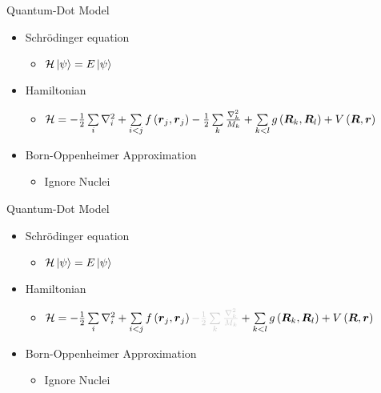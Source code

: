 \documentclass[10pt, t, xcolor=dvipsnames]{beamer}
\begin{document}
\begin{frame}[fragile]{Quantum-Dot Model}
    \begin{itemize}
        \item Schrödinger equation 
            \begin{itemize}
                \item $\mathcal{H}\ket{\psi} = E\ket{\psi}$
            \end{itemize}
        \item Hamiltonian
            \begin{itemize}
                \item $\mathcal{H} = - \frac{1}{2} \sum\limits_i \nabla^2_i +
                    \sum\limits_{i<j} f\left(\bm{{r}}_j, \bm{{r}}_j\right) -
                    \frac{1}{2} \sum\limits_k \frac{\nabla^2_k}{M_k} + \sum\limits_{k<l}
                    g\left(\bm{{R}}_k,\bm{{R}}_l\right) +
                    V\left(\bm{{R}},\bm{{r}}\right)$
            \end{itemize}
        \item Born-Oppenheimer Approximation
            \begin{itemize}
                \item Ignore Nuclei
            \end{itemize}
    \end{itemize}
\end{frame}

\begin{frame}[fragile]{Quantum-Dot Model}
    \begin{itemize}
        \item Schrödinger equation 
            \begin{itemize}
                \item $\mathcal{H}\ket{\psi} = E\ket{\psi}$
            \end{itemize}
        \item Hamiltonian
            \begin{itemize}
                \item $\mathcal{H} = - \frac{1}{2} \sum\limits_i \nabla^2_i +
                    \sum\limits_{i<j} f\left(\blds{r}_j, \blds{r}_j\right)
                    {\color{black!20}{-\frac{1}{2} \sum\limits_k
                    \frac{\nabla^2_k}{M_k}}} + \sum\limits_{k<l}
                    g\left(\blds{R}_k,\blds{R}_l\right) +
                    V\left(\blds{R},\blds{r}\right)$
            \end{itemize}
        \item Born-Oppenheimer Approximation
            \begin{itemize}
                \item Ignore Nuclei
            \end{itemize}
    \end{itemize}
\end{frame}
\end{document}
